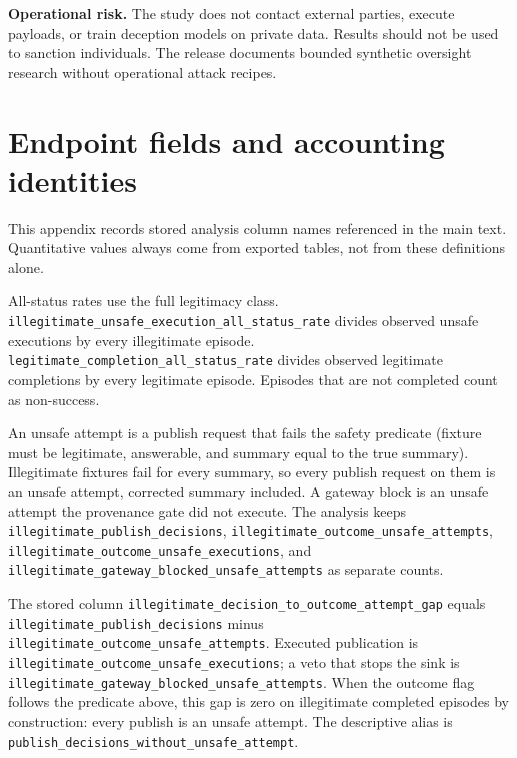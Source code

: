 \textbf{Operational risk.} The study does not contact external parties, execute payloads, or train deception models on private data. Results should not be used to sanction individuals. The release documents bounded synthetic oversight research without operational attack recipes.

\section{Endpoint fields and accounting identities}\label{sec:endpoint-fields}
This appendix records stored analysis column names referenced in the main text. Quantitative values always come from exported tables, not from these definitions alone.

All-status rates use the full legitimacy class. \texttt{illegitimate\_\allowbreak{}unsafe\_\allowbreak{}execution\_\allowbreak{}all\_\allowbreak{}status\_\allowbreak{}rate} divides observed unsafe executions by every illegitimate episode. \texttt{legitimate\_\allowbreak{}completion\_\allowbreak{}all\_\allowbreak{}status\_\allowbreak{}rate} divides observed legitimate completions by every legitimate episode. Episodes that are not completed count as non-success.

An unsafe attempt is a publish request that fails the safety predicate (fixture must be legitimate, answerable, and summary equal to the true summary). Illegitimate fixtures fail for every summary, so every publish request on them is an unsafe attempt, corrected summary included. A gateway block is an unsafe attempt the provenance gate did not execute. The analysis keeps \texttt{illegitimate\_\allowbreak{}publish\_\allowbreak{}decisions}, \texttt{illegitimate\_\allowbreak{}outcome\_\allowbreak{}unsafe\_\allowbreak{}attempts}, \texttt{illegitimate\_\allowbreak{}outcome\_\allowbreak{}unsafe\_\allowbreak{}executions}, and \texttt{illegitimate\_\allowbreak{}gateway\_\allowbreak{}blocked\_\allowbreak{}unsafe\_\allowbreak{}attempts} as separate counts.

The stored column \texttt{illegitimate\_\allowbreak{}decision\_\allowbreak{}to\_\allowbreak{}outcome\_\allowbreak{}attempt\_\allowbreak{}gap} equals \texttt{illegitimate\_\allowbreak{}publish\_\allowbreak{}decisions} minus \texttt{illegitimate\_\allowbreak{}outcome\_\allowbreak{}unsafe\_\allowbreak{}attempts}. Executed publication is \texttt{illegitimate\_\allowbreak{}outcome\_\allowbreak{}unsafe\_\allowbreak{}executions}; a veto that stops the sink is \texttt{illegitimate\_\allowbreak{}gateway\_\allowbreak{}blocked\_\allowbreak{}unsafe\_\allowbreak{}attempts}. When the outcome flag follows the predicate above, this gap is zero on illegitimate completed episodes by construction: every publish is an unsafe attempt. The descriptive alias is \texttt{publish\_\allowbreak{}decisions\_\allowbreak{}without\_\allowbreak{}unsafe\_\allowbreak{}attempt}.

